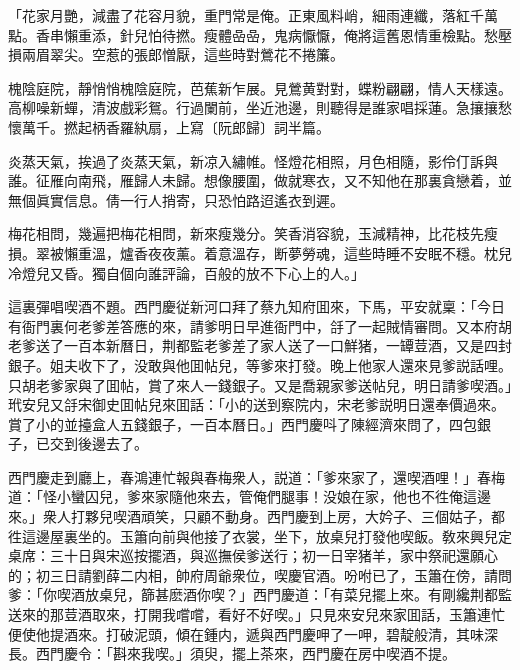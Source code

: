 \begin{myquote}
「花家月艷，減盡了花容月貌，重門常是俺。正東風料峭，細雨連纖，落紅千萬點。香串懶重添，針兒怕待撚。瘦體喦喦，鬼病懨懨，俺將這舊恩情重檢點。愁壓損兩眉翠尖。空惹的張郎憎厭，這些時對鶯花不捲簾。

槐陰庭院，靜悄悄槐陰庭院，芭蕉新乍展。見鶯黄對對，蝶粉翩翩，情人天樣遠。高柳噪新蟬，清波戲彩鴛。行過闌前，坐近池邊，則聽得是誰家唱採蓮。急攘攘愁懷萬千。撚起柄香羅紈扇，上寫〔阮郎歸〕詞半篇。

炎蒸天氣，挨過了炎蒸天氣，新凉入繡帷。怪燈花相照，月色相隨，影伶仃訴與誰。征雁向南飛，雁歸人未歸。想像腰圍，做就寒衣，又不知他在那裏貪戀着，並無個眞實信息。倩一行人捎寄，只恐怕路迢遙衣到遲。

梅花相問，幾遍把梅花相問，新來瘦幾分。笑香消容貌，玉減精神，比花枝先瘦損。翠被懶重溫，爐香夜夜薰。着意溫存，断夢勞魂，這些時睡不安眠不穩。枕兒冷燈兒又昏。獨自個向誰評論，百般的放不下心上的人。」
\end{myquote}

這裏彈唱喫酒不題。西門慶従新河口拜了蔡九知府囬來，下馬，平安就稟：「今日有衙門裏何老爹差答應的來，請爹明日早進衙門中，㧱了一起賊情審問。又本府胡老爹送了一百本新曆日，荆都監老爹差了家人送了一口鮮猪，一罈荳酒，又是四封銀子。姐夫收下了，没敢與他囬帖兒，等爹來打發。晚上他家人還來見爹説話哩。只胡老爹家與了囬帖，賞了來人一錢銀子。又是喬親家爹送帖兒，明日請爹喫酒。」玳安兒又㧱宋御史囬帖兒來囬話：「小的送到察院内，宋老爹説明日還奉價過來。賞了小的並擡盒人五錢銀子，一百本曆日。」西門慶呌了陳經濟來問了，四包銀子，已交到後邊去了。

西門慶走到廳上，春鴻連忙報與春梅衆人，説道：「爹來家了，還喫酒哩！」春梅道：「怪小蠻囚兒，爹來家隨他來去，管俺們腿事！没娘在家，他也不徃俺這邊來。」衆人打夥兒喫酒頑笑，只顧不動身。西門慶到上房，大妗子、三個姑子，都徃這邊屋裏坐的。玉簫向前與他接了衣裳，坐下，放桌兒打發他喫飯。敎來興兒定桌席：三十日與宋巡按擺酒，與巡撫侯爹送行；初一日宰猪羊，家中祭祀還願心的；初三日請劉薛二内相，帥府周爺衆位，喫慶官酒。吩咐已了，玉簫在傍，請問爹：「你喫酒放桌兒，篩甚麽酒你喫？」西門慶道：「有菜兒擺上來。有剛纔荆都監送來的那荳酒取來，打開我嚐嚐，看好不好喫。」只見來安兒來家囬話，玉簫連忙便使他提酒來。打破泥頭，傾在鍾内，遞與西門慶呷了一呷，碧靛般清，其味深長。西門慶令：「斟來我喫。」須臾，擺上茶來，西門慶在房中喫酒不提。

